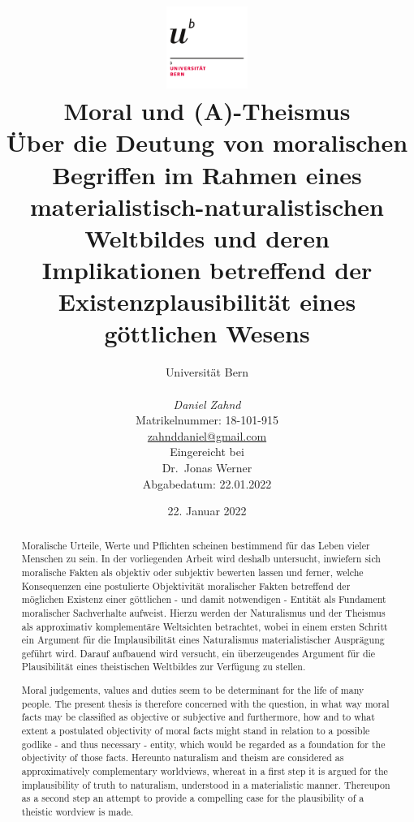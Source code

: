\documentclass[a4paper,11pt]{article}
\title{\vspace{1cm}\includegraphics[width=0.2\textwidth]{figures/unibe_logo.png} \\ \vspace{2cm} \Huge Moral und (A)-Theismus\\ \vspace{0.5cm} \large Über die Deutung von moralischen Begriffen im Rahmen eines materialistisch-naturalistischen Weltbildes und deren Implikationen betreffend der Existenzplausibilität eines göttlichen Wesens\vspace{2cm}}
\author{Universität Bern \\ \vspace{0.5cm}\\ \normalsize \textit{Daniel Zahnd} \\ \footnotesize Matrikelnummer: 18-101-915 \\ \footnotesize \href{mailto:zahnddaniel@gmail.com}{zahnddaniel@gmail.com}  \vspace{1cm}\\ \footnotesize Eingereicht bei\\ \normalsize Dr.~Jonas Werner\\ \vspace{1cm}  \footnotesize Abgabedatum: 22.01.2022}
\date{22. Januar 2022}
\numberwithin{equation}{section}
\begin{document}
\maketitle
\thispagestyle{empty}

\newpage

\begin{abstract}
Moralische Urteile, Werte und Pflichten scheinen bestimmend für das Leben vieler Menschen zu sein. In der vorliegenden Arbeit wird deshalb untersucht, inwiefern sich moralische Fakten als objektiv oder subjektiv bewerten lassen und ferner, welche Konsequenzen eine postulierte Objektivität moralischer Fakten betreffend der möglichen Existenz einer göttlichen - und damit notwendigen - Entität als Fundament moralischer Sachverhalte aufweist. Hierzu werden der Naturalismus und der Theismus als approximativ komplementäre Weltsichten betrachtet, wobei in einem ersten Schritt ein Argument für die Implausibilität eines Naturalismus materialistischer Ausprägung geführt wird. Darauf aufbauend wird versucht, ein überzeugendes Argument für die Plausibilität eines theistischen Weltbildes zur Verfügung zu stellen.
\end{abstract}


\begin{otherlanguage}{english}
\begin{abstract}
Moral judgements, values and duties seem to be determinant for the life of many people. The present thesis is therefore concerned with the question, in what way moral facts may be classified as objective or subjective and furthermore, how and to what extent a postulated objectivity of moral facts might stand in relation to a possible godlike - and thus necessary - entity, which would be regarded as a foundation for the objectivity of those facts. Hereunto naturalism and theism are considered as approximatively complementary worldviews, whereat in a first step it is argued for the implausibility of truth to naturalism, understood in a materialistic manner. Thereupon as a second step an attempt to provide a compelling case for the plausibility of a theistic wordview is made.
\end{abstract}
\end{otherlanguage}

\newpage


\tableofcontents %

\FloatBarrier
\newpage

\setcounter{page}{1}
\end{document}
